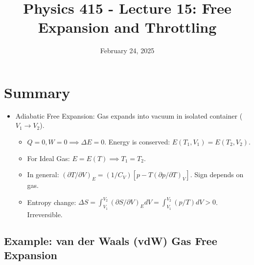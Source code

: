 \documentclass[11pt]{article}
\title{Physics 415 - Lecture 15: Free Expansion and Throttling}
\date{February 24, 2025}
\author{} %
\begin{document}
\maketitle
\thispagestyle{empty}

\section*{Summary}

\begin{itemize}
    \item Adiabatic Free Expansion: Gas expands into vacuum in isolated container ($V_1 \to V_2$).
        \begin{itemize}
            \item $Q=0, W=0 \implies \Delta E = 0$. Energy is conserved: $E(T_1, V_1) = E(T_2, V_2)$.
            \item For Ideal Gas: $E=E(T) \implies T_1 = T_2$.
            \item In general: $(\partial T / \partial V)_E = (1/C_V)[p - T(\partial p/\partial T)_V]$. Sign depends on gas.
            \item Entropy change: $\Delta S = \int_{V_1}^{V_2} (\partial S/\partial V)_E dV = \int_{V_1}^{V_2} (p/T) dV > 0$. Irreversible.
        \end{itemize}
\end{itemize}

\subsection*{Example: van der Waals (vdW) Gas Free Expansion}
\end{document}
